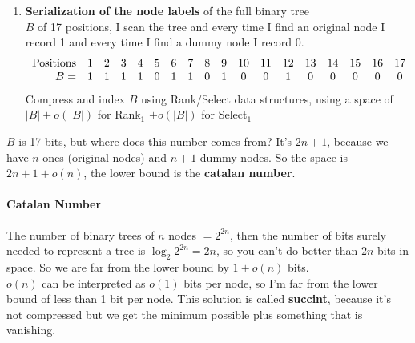 \documentclass[10pt]{report}
\begin{document}
\begin{enumerate}
\begin{center}
	\end{center}
	\item \textbf{Serialization of the node labels} of the full binary tree\\
	$B$ of 17 positions, I scan the tree and every time I find an original node I record 1 and every time I find a dummy node I record 0.
	$$\begin{array}{r c c c c c c c c c c c c c c c c c}
	\hbox{Positions}&1&2&3&4&5&6&7&8&9&10&11&12&13&14&15&16&17\\
	B = &1&1&1&1&0&1&1&0&1&0&0&1&0&0&0&0&0
	\end{array}$$
	Compress and index $B$ using Rank/Select data structures, using a space of $|B|+o(|B|)$ for Rank$_1$ $+ o(|B|)$ for Select$_1$
\end{enumerate}
$B$ is 17 bits, but where does this number comes from? It's $2n+1$, because we have $n$ ones (original nodes) and $n+1$ dummy nodes. So the space is $2n+1+o(n)$, the lower bound is the \textbf{catalan number}.
\paragraph{Catalan Number} The number of binary trees of $n$ nodes $= 2^{2n}$, then the number of bits surely needed to represent a tree is $\log_2 2^{2n} = 2n$, so you can't do better than $2n$ bits in space. So we are far from the lower bound by $1+o(n)$ bits.\\
$o(n)$ can be interpreted as $o(1)$ bits per node, so I'm far from the lower bound of less than 1 bit per node. This solution is called \textbf{succint}, because it's not compressed but we get the minimum possible plus something that is vanishing.\\\\
\end{document}
